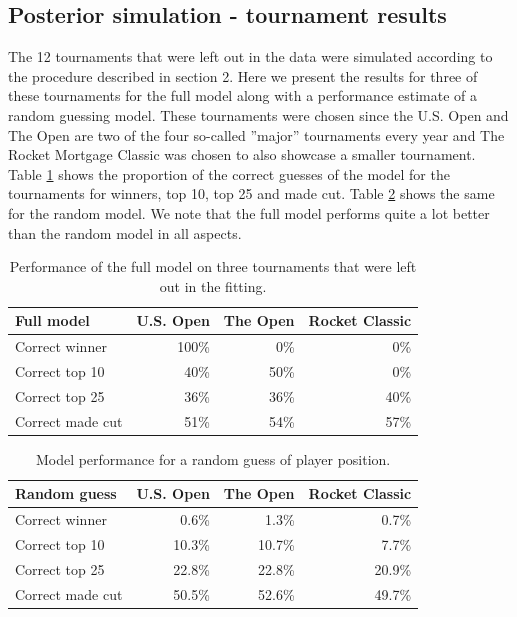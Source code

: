 \documentclass{article}\usepackage[]{graphicx}\usepackage[]{color}
\begin{document}
\newpage
\null\newpage
\subsection{Posterior simulation - tournament results}
The 12 tournaments that were left out in the data were simulated according to the procedure described in section 2. Here we present the results for three of these tournaments for the full model along with a performance estimate of a random guessing model. These tournaments were chosen since the U.S. Open and The Open are two of the four so-called ''major'' tournaments every year and The Rocket Mortgage Classic was chosen to also showcase a smaller tournament. Table \ref{tab:predictions_full} shows the proportion of the correct guesses of the model for the tournaments for winners, top 10, top 25 and made cut. Table \ref{tab:predictions_random} shows the same for the random model. We note that the full model performs quite a lot better than the random model in all aspects.

\begin{table}[!h]
\centering
\caption{Performance of the full model on three tournaments that were left out in the fitting.}
\begin{tabular}[t]{lrrr}
\toprule
\textbf{Full model} & \textbf{U.S. Open} & \textbf{The Open} & \textbf{Rocket Classic}\\
\midrule
Correct winner & 100\% & 0\% & 0\% \\
Correct top 10 & 40\% & 50\% & 0\% \\
Correct top 25 & 36\% & 36\% & 40\% \\
Correct made cut & 51\% & 54\% & 57\% \\
\bottomrule
\end{tabular}
\label{tab:predictions_full}
\end{table}

\begin{table}[!h]
\centering
    \caption{Model performance for a random guess of player position.}
    \begin{tabular}[t]{lrrr}
    \toprule
    \textbf{Random guess} & \textbf{U.S. Open} & \textbf{The Open} & \textbf{Rocket Classic}\\
    \midrule
        Correct winner & 0.6\% & 1.3\% & 0.7\% \\
        Correct top 10 & 10.3\% & 10.7\% & 7.7\% \\
        Correct top 25 & 22.8\% & 22.8\% & 20.9\% \\
        Correct made cut & 50.5\% & 52.6\% & 49.7\% \\
    \bottomrule
    \end{tabular}
    \label{tab:predictions_random}
\end{table}
\end{document}
